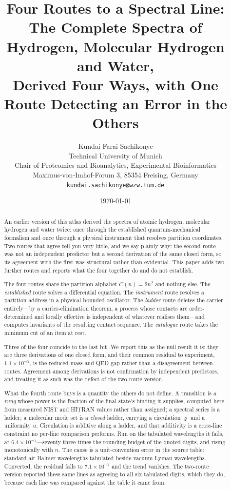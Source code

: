 \documentclass[11pt,a4paper]{article}
\title{\Large\textbf{Four Routes to a Spectral Line: \\
The Complete Spectra of Hydrogen, Molecular Hydrogen and Water,\\
Derived Four Ways, with One Route Detecting an Error in the Others}}
\author{Kundai Farai Sachikonye\\[2pt]
\small Technical University of Munich \\
\small Chair of Proteomics and Bioanalytics, Experimental Bioinformatics\\
\small Maximus-von-Imhof-Forum 3, 85354 Freising, Germany\\
\small \texttt{kundai.sachikonye@wzw.tum.de}}
\date{\today}
\theoremstyle{stmtstyle}
\theoremstyle{definition}
\theoremstyle{remark}
\newcommand{\circu}{\varrho}
\newcommand{\unif}{u}
\begin{document}
\maketitle

\begin{abstract}
\noindent
An earlier version of this atlas derived the spectra of atomic hydrogen,
molecular hydrogen and water twice: once through the established
quantum-mechanical formalism and once through a physical instrument that
resolves partition coordinates. Two routes that agree tell you very little,
and we say plainly why: the second route was not an independent predictor
but a second derivation of the same closed form, so its agreement with the
first was structural rather than evidential. This paper adds two further
routes and reports what the four together do and do not establish.

The four routes share the partition alphabet $C(n)=2n^{2}$ and nothing
else. The \emph{established} route solves a differential equation. The
\emph{instrument} route resolves a partition address in a physical bounded
oscillator. The \emph{ladder} route deletes the carrier entirely---by a
carrier-elimination theorem, a process whose contacts are order-determined
and locally effective is independent of whatever realises them---and
computes invariants of the resulting contact sequence. The
\emph{catalogue} route takes the minimum cut of an item at rest.

Three of the four coincide to the last bit. We report this as the null
result it is: they are three derivations of one closed form, and their
common residual to experiment, $1.1\times10^{-5}$, is the reduced-mass and
QED gap rather than a disagreement between routes. Agreement among
derivations is not confirmation by independent predictors, and treating it
as such was the defect of the two-route version.

What the fourth route buys is a quantity the others do not define. A
transition is a \emph{rung} whose power is the fraction of the final
state's binding it supplies, computed here from measured NIST and HITRAN
values rather than assigned; a spectral series is a ladder; a molecular
mode set is a \emph{closed} ladder, carrying a circulation $\circu$ and a
uniformity $\unif$. Circulation is additive along a ladder, and that
additivity is a cross-line constraint no per-line comparison performs. Run
on the tabulated wavelengths it fails, at $6.4\times10^{-5}$---seventy-three
times the rounding budget of the quoted digits, and rising monotonically
with $n$. The cause is a unit-convention error in the source table:
standard-air Balmer wavelengths tabulated beside vacuum Lyman wavelengths.
Converted, the residual falls to $7.1\times10^{-7}$ and the trend vanishes.
The two-route version reported these same lines as agreeing to all six
tabulated digits, which they do, because each line was compared against the
table it came from.


\end{abstract}
\end{document}
